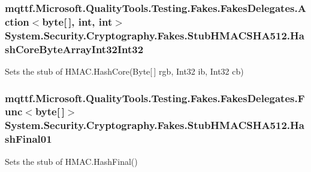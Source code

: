 \hypertarget{class_system_1_1_security_1_1_cryptography_1_1_fakes_1_1_stub_h_m_a_c_s_h_a512_a0313cbc4a09993147a35733418e3cb6a}{
\subsubsection[{Hash\-Core\-Byte\-Array\-Int32\-Int32}]{\setlength{\rightskip}{0pt plus 5cm}mqttf.\-Microsoft.\-Quality\-Tools.\-Testing.\-Fakes.\-Fakes\-Delegates.\-Action$<$byte\mbox{[}$\,$\mbox{]}, int, int$>$ System.\-Security.\-Cryptography.\-Fakes.\-Stub\-H\-M\-A\-C\-S\-H\-A512.\-Hash\-Core\-Byte\-Array\-Int32\-Int32}}\label{class_system_1_1_security_1_1_cryptography_1_1_fakes_1_1_stub_h_m_a_c_s_h_a512_a0313cbc4a09993147a35733418e3cb6a}


Sets the stub of H\-M\-A\-C.\-Hash\-Core(\-Byte\mbox{[}$\,$\mbox{]} rgb, Int32 ib, Int32 cb)

\hypertarget{class_system_1_1_security_1_1_cryptography_1_1_fakes_1_1_stub_h_m_a_c_s_h_a512_adab92ff1a442a7e0e4a9692a5ba074ba}{
\subsubsection[{Hash\-Final01}]{\setlength{\rightskip}{0pt plus 5cm}mqttf.\-Microsoft.\-Quality\-Tools.\-Testing.\-Fakes.\-Fakes\-Delegates.\-Func$<$byte\mbox{[}$\,$\mbox{]}$>$ System.\-Security.\-Cryptography.\-Fakes.\-Stub\-H\-M\-A\-C\-S\-H\-A512.\-Hash\-Final01}}\label{class_system_1_1_security_1_1_cryptography_1_1_fakes_1_1_stub_h_m_a_c_s_h_a512_adab92ff1a442a7e0e4a9692a5ba074ba}


Sets the stub of H\-M\-A\-C.\-Hash\-Final()

